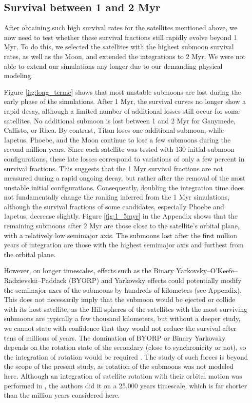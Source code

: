 \documentclass{aa}
\begin{document}
\subsection{Survival between 1 and 2 Myr}

After obtaining such high survival rates for the satellites mentioned above, we now need to test whether these survival fractions still rapidly evolve beyond 1 Myr.
To do this, we selected the satellites with the highest submoon survival rates, as well as the Moon, and extended the integrations to 2 Myr. We were not able to extend our simulations any longer due to our demanding physical modeling.

Figure \ref{fig:long_terme} shows that most unstable submoons are lost during the early phase of the simulations. After 1 Myr, the survival curves no longer show a rapid decay, although a limited number of additional losses still occur for some satellites. No additional submoon is lost between 1 and 2 Myr for Ganymede, Callisto, or Rhea. By contrast, Titan loses one additional submoon, while Iapetus, Phoebe, and the Moon continue to lose a few submoons during the second million years. Since each satellite was tested with 130 initial submoon configurations, these late losses correspond to variations of only a few percent in survival fractions. This suggests that the 1 Myr survival fractions are not measured during a rapid ongoing decay, but rather after the removal of the most unstable initial configurations.
Consequently, doubling the integration time does not fundamentally change the ranking inferred from the 1 Myr simulations, although the survival fractions of some candidates, especially Phoebe and Iapetus, decrease slightly. Figure \ref{fig:1_5myr} in the Appendix shows that the remaining submoons after 2 Myr are those close to the satellite's orbital plane, with a relatively low semimajor axis. The submoons lost after the first million years of integration are those with the highest semimajor axis and furthest from the orbital plane. 


However, on longer timescales, effects such as the Binary Yarkovsky–O'Keefe–Radzievskii–Paddack (BYORP) and Yarkovsky effects could potentially modify the semimajor axes of the submoons by hundreds of kilometers (see Appendix). This does not necessarily imply that the submoon would be ejected or collide with its host satellite, as the Hill spheres of the satellites with the most surviving submoons are typically a few thousand kilometers, but without a deeper study, we cannot state with confidence that they would not reduce the survival after tens of millions of years. The domination of BYORP or Binary Yarkovsky depends on the rotation state of the secondary (close to synchronicity or not), so the integration of rotation would be required \citep{Zhou_2024}. The study of such forces is beyond the scope of the present study, as rotation of the submoons was not modeled here. Although an integration of satellite rotation with their orbital motion was performed in \cite{Dahoumane_2025}, the authors did it on a 25,000 years timescale, which is far shorter than the million years considered here.
\end{document}
